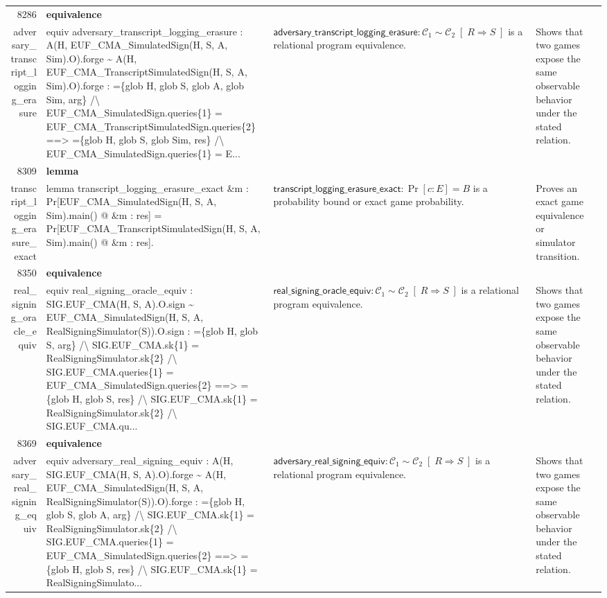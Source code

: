 \documentclass[10pt]{article}
\newcommand{\ec}[1]{\begingroup\ttfamily\scriptsize #1\endgroup}
\begin{document}
\begin{longtable}{r L{0.17\textwidth} L{0.26\textwidth} L{0.27\textwidth} L{0.20\textwidth}}
8286 & \textbf{equivalence}\\\ec{adversary\_transcript\_logging\_erasure} & \ec{equiv adversary\_transcript\_logging\_erasure : A(H, EUF\_CMA\_SimulatedSign(H, S, A, Sim).O).forge \textasciitilde{} A(H, EUF\_CMA\_TranscriptSimulatedSign(H, S, A, Sim).O).forge : =\{glob H, glob S, glob A, glob Sim, arg\} /\textbackslash{} EUF\_CMA\_SimulatedSign.queries\{1\} = EUF\_CMA\_TranscriptSimulatedSign.queries\{2\} ==> =\{glob H, glob S, glob Sim, res\} /\textbackslash{} EUF\_CMA\_SimulatedSign.queries\{1\} = E...} & \(\mathsf{adversary\_transcript\_logging\_erasure} : \mathcal{C}_1 \sim \mathcal{C}_2 \;[\;R \Rightarrow S\;]\) is a relational program equivalence. & Shows that two games expose the same observable behavior under the stated relation. \\
8309 & \textbf{lemma}\\\ec{transcript\_logging\_erasure\_exact} & \ec{lemma transcript\_logging\_erasure\_exact \&m : Pr[EUF\_CMA\_SimulatedSign(H, S, A, Sim).main() @ \&m : res] = Pr[EUF\_CMA\_TranscriptSimulatedSign(H, S, A, Sim).main() @ \&m : res].} & \(\mathsf{transcript\_logging\_erasure\_exact} : \Pr[c : E] = B\) is a probability bound or exact game probability. & Proves an exact game equivalence or simulator transition. \\
8350 & \textbf{equivalence}\\\ec{real\_signing\_oracle\_equiv} & \ec{equiv real\_signing\_oracle\_equiv : SIG.EUF\_CMA(H, S, A).O.sign \textasciitilde{} EUF\_CMA\_SimulatedSign(H, S, A, RealSigningSimulator(S)).O.sign : =\{glob H, glob S, arg\} /\textbackslash{} SIG.EUF\_CMA.sk\{1\} = RealSigningSimulator.sk\{2\} /\textbackslash{} SIG.EUF\_CMA.queries\{1\} = EUF\_CMA\_SimulatedSign.queries\{2\} ==> =\{glob H, glob S, res\} /\textbackslash{} SIG.EUF\_CMA.sk\{1\} = RealSigningSimulator.sk\{2\} /\textbackslash{} SIG.EUF\_CMA.qu...} & \(\mathsf{real\_signing\_oracle\_equiv} : \mathcal{C}_1 \sim \mathcal{C}_2 \;[\;R \Rightarrow S\;]\) is a relational program equivalence. & Shows that two games expose the same observable behavior under the stated relation. \\
8369 & \textbf{equivalence}\\\ec{adversary\_real\_signing\_equiv} & \ec{equiv adversary\_real\_signing\_equiv : A(H, SIG.EUF\_CMA(H, S, A).O).forge \textasciitilde{} A(H, EUF\_CMA\_SimulatedSign(H, S, A, RealSigningSimulator(S)).O).forge : =\{glob H, glob S, glob A, arg\} /\textbackslash{} SIG.EUF\_CMA.sk\{1\} = RealSigningSimulator.sk\{2\} /\textbackslash{} SIG.EUF\_CMA.queries\{1\} = EUF\_CMA\_SimulatedSign.queries\{2\} ==> =\{glob H, glob S, res\} /\textbackslash{} SIG.EUF\_CMA.sk\{1\} = RealSigningSimulato...} & \(\mathsf{adversary\_real\_signing\_equiv} : \mathcal{C}_1 \sim \mathcal{C}_2 \;[\;R \Rightarrow S\;]\) is a relational program equivalence. & Shows that two games expose the same observable behavior under the stated relation. \\

\end{longtable}
\end{document}
